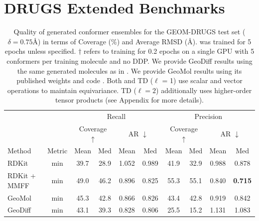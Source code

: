 \section{DRUGS Extended Benchmarks}
\label{section:appendix-more-drugs}
\vspace{-1ex}
\begin{table}[H]
\begin{center}
\caption{Quality of generated conformer ensembles for the GEOM-DRUGS test set ($\delta=0.75$\AA) in terms of Coverage (\%) and Average RMSD (\AA). \model was trained for 5 epochs unless specified. \model$\dagger$ refers to training for 0.2 epochs on a single GPU with 5 conformers per training molecule and no DDP. We provide GeoDiff results using the same generated molecules as in \citet{torsional-diffusion}. We provide GeoMol results using its published weights and code \citep{GeoMol}. 
Both \model and TD ($\ell$ = 1) use scalar and vector operations to maintain equivariance. 
TD ($\ell=2$) additionally uses higher-order tensor products (see Appendix  for more details).}
\label{tab:results_drugs_app}
\begin{tabular}{lc|cccc|cccc} \toprule
               & \multicolumn{1}{l|}{} & \multicolumn{4}{c|}{Recall} & \multicolumn{4}{c}{Precision}  \\
                 & \multicolumn{1}{l|}{} & \multicolumn{2}{c}{Coverage $\uparrow$} & \multicolumn{2}{c|}{AR $\downarrow$} & \multicolumn{2}{c}{Coverage $\uparrow$} & \multicolumn{2}{c}{AR $\downarrow$} \\
Method  & Metric & Mean & Med & Mean & Med & Mean & Med & Mean & Med \\ \midrule
\multicolumn{1}{l|}{RDKit} & min  & 39.7 & 28.9 & 1.052 & 0.989 & 41.9 & 32.9 & 0.988 & 0.878 \\
\multicolumn{1}{l|}{RDKit + MMFF} & min  & 49.0 & 46.2 & 0.896 & 0.825 & 55.3 & 55.1 & 0.840 & \textbf{0.715} \\
\multicolumn{1}{l|}{GeoMol} & min  & 45.3 & 42.8 & 0.866 & 0.826 & 43.4 & 42.8 & 0.919 & 0.842 \\
\multicolumn{1}{l|}{GeoDiff} & min  & 43.1 & 39.3 & 0.828 & 0.806 & 25.5 & 15.2 & 1.131 & 1.083 \\

\end{tabular}
\end{center}
\end{table}
